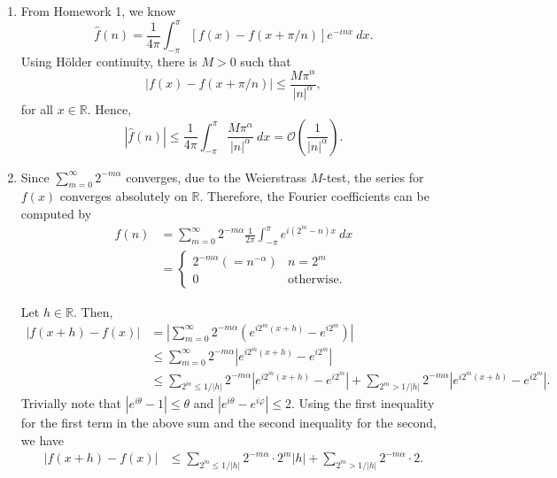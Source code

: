 \documentclass[12pt]{amsart}
\newcommand{\R}{\mathbb{R}}
\newcommand{\wh}[1]{\widehat{#1}}
\newcommand{\calO}{\mathcal{O}}
\begin{document}
\begin{enumerate}[label=(\alph*)]
	\item From Homework 1, we know 
	\begin{equation*}
		\wh f(n) = \frac{1}{4\pi}\int_{-\pi}^\pi \left[f(x) - f(x + \pi/n)\right]e^{-inx}~dx.
	\end{equation*}
	Using H\"older continuity, there is $M > 0$ such that 
	\begin{equation*}
		|f(x) - f(x + \pi/n)|\le\frac{M\pi^\alpha}{|n|^\alpha},
	\end{equation*}
	for all $x\in\R$. Hence, 
	\begin{equation*}
		|\wh f(n)|\le\frac{1}{4\pi}\int_{-\pi}^\pi\frac{M\pi^\alpha}{|n|^\alpha}~dx = \calO\left(\frac{1}{|n|^\alpha}\right).
	\end{equation*}

	\item Since $\sum_{m = 0}^\infty 2^{-m\alpha}$ converges, due to the Weierstrass $M$-test, the series for $f(x)$ converges absolutely on $\R$. Therefore, the Fourier coefficients can be computed by 
	\begin{align*}
		\wh f(n) &= \sum_{m = 0}^\infty 2^{-m\alpha}\frac{1}{2\pi}\int_{-\pi}^{\pi}e^{i(2^m - n)x}~dx\\
		&= 
		\begin{cases}
			2^{-m\alpha} (= n^{-\alpha}) & n = 2^{m}\\
			0 & \text{otherwise}.
		\end{cases}
	\end{align*}

	Let $h\in\R$. Then,
	\begin{align*}
		|f(x + h) - f(x)| &= \left|\sum_{m = 0}^\infty 2^{-m\alpha}\left(e^{i2^m(x + h)} - e^{i2^m}\right)\right|\\
		&\le\sum_{m = 0}^\infty 2^{-m\alpha} |e^{i2^m(x + h)} - e^{i2^m}|\\
		&\le\sum_{2^m\le 1/|h|} 2^{-m\alpha} |e^{i2^m(x + h)} - e^{i2^m}| + \sum_{2^m > 1/|h|} 2^{-m\alpha} |e^{i2^m(x + h)} - e^{i2^m}|.
	\end{align*}
	Trivially note that $|e^{i\theta} - 1|\le\theta$ and $|e^{i\theta} - e^{i\varphi}|\le 2$. Using the first inequality for the first term in the above sum and the second inequality for the second, we have 
	\begin{align*}
		|f(x + h) - f(x)| &\le \sum_{2^m\le 1/|h|} 2^{-m\alpha}\cdot 2^m|h| + \sum_{2^m > 1/|h|} 2^{-m\alpha}\cdot 2.
	\end{align*}


\end{enumerate}
\end{document}
